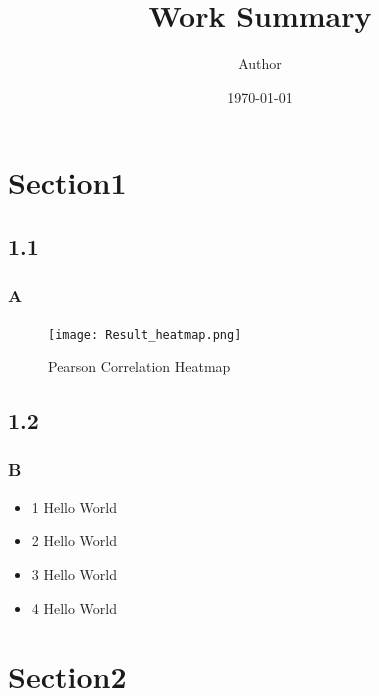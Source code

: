 \documentclass[11pt]{beamer}                                                                                                                 \usetheme{Madrid}
\begin{document}
	\title[Work Summary]{Work Summary}
	\author[Author]{Author} %
	\date{\today}  %
\begin{frame}
	\titlepage
\end{frame}

\section[Contents]{}
\frame {
	\frametitle{\secname}
	\tableofcontents
}

\section{Section1}
\subsection{1.1}
\begin{frame}[fragile]
	\frametitle{A}
	\begin{figure}[h]%
		\centering  %
		\texttt{[image: Result\_heatmap.png]}  
		\caption{Pearson Correlation Heatmap}  %
	\end{figure}
\end{frame}

\subsection{1.2}
\begin{frame}[fragile]
	\frametitle{B}
	\begin{itemize}
		\item 1 Hello World
		\item 2 Hello World
		\item 3 Hello World
		\item 4 Hello World
	\end{itemize}
\end{frame}

\section{Section2}
\end{document}
